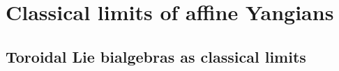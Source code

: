             \minitoc
        
            
    
            
    
            
    
        \newpage

    \part{Classical limits of affine Yangians}
        \chapter{Toroidal Lie bialgebras as classical limits}
            \begin{abstract}
                
            \end{abstract}
    
            \minitoc
    
            
    
            

    \newpage

    \printbibliography

